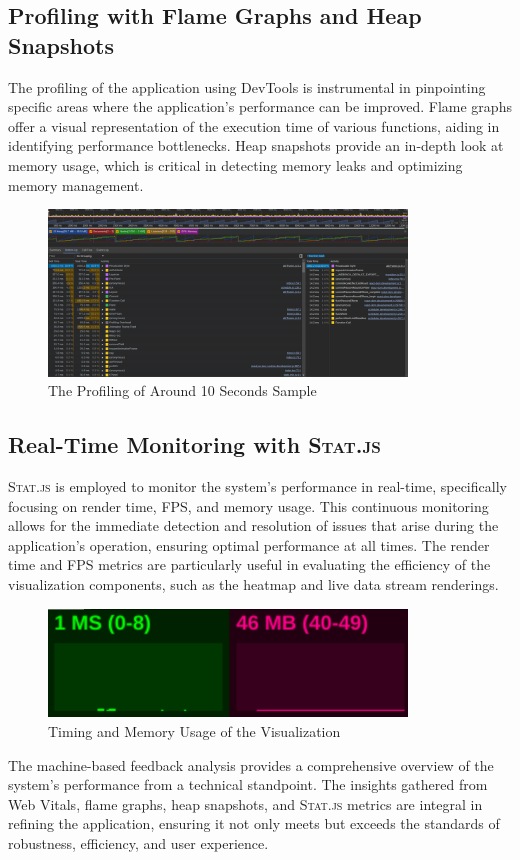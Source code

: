 \subsection{Profiling with Flame Graphs and Heap Snapshots}
The profiling of the application using DevTools is instrumental in pinpointing specific areas where the application's performance can be improved. Flame graphs offer a visual representation of the execution time of various functions, aiding in identifying performance bottlenecks. Heap snapshots provide an in-depth look at memory usage, which is critical in detecting memory leaks and optimizing memory management.

\begin{figure}[htbp]
  \centering
  \includegraphics[width=0.85\textwidth]{Pictures/profiling}
  \caption{\label{fig:profiling}The Profiling of Around 10 Seconds Sample}
\end{figure}
\subsection{Real-Time Monitoring with \textsc{Stat.js}}
\textsc{Stat.js} is employed to monitor the system's performance in real-time, specifically focusing on render time, FPS, and memory usage. This continuous monitoring allows for the immediate detection and resolution of issues that arise during the application's operation, ensuring optimal performance at all times. The render time and FPS metrics are particularly useful in evaluating the efficiency of the visualization components, such as the heatmap and live data stream renderings.

\begin{figure}[htbp]
  \centering
  \includegraphics[width=0.85\textwidth]{Pictures/stats}
  \caption{\label{fig:stats}Timing and Memory Usage of the Visualization}
\end{figure}

The machine-based feedback analysis provides a comprehensive overview of the system's performance from a technical standpoint. The insights gathered from Web Vitals, flame graphs, heap snapshots, and \textsc{Stat.js} metrics are integral in refining the application, ensuring it not only meets but exceeds the standards of robustness, efficiency, and user experience.
